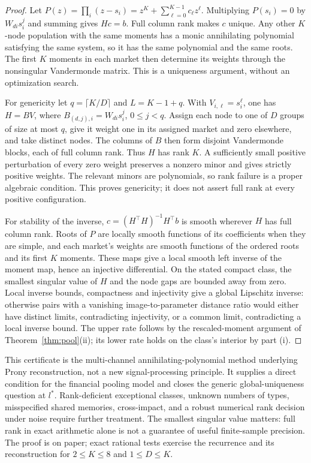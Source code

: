 \begin{proof}
Let $P(z)=\prod_i(z-s_i)=z^K+\sum_{\ell=0}^{K-1}c_\ell z^\ell$. Multiplying $P(s_i)=0$ by $W_{di}s_i^j$ and summing gives $Hc=b$. Full column rank makes $c$ unique. Any other $K$-node population with the same moments has a monic annihilating polynomial satisfying the same system, so it has the same polynomial and the same roots. The first $K$ moments in each market then determine its weights through the nonsingular Vandermonde matrix. This is a uniqueness argument, without an optimization search.

For genericity let $q=\lceil K/D\rceil$ and $L=K-1+q$. With $V_{i,\ell}=s_i^\ell$, one has $H=BV$, where $B_{(d,j),i}=W_{di}s_i^j$, $0\le j<q$. Assign each node to one of $D$ groups of size at most $q$, give it weight one in its assigned market and zero elsewhere, and take distinct nodes. The columns of $B$ then form disjoint Vandermonde blocks, each of full column rank. Thus $H$ has rank $K$. A sufficiently small positive perturbation of every zero weight preserves a nonzero minor and gives strictly positive weights. The relevant minors are polynomials, so rank failure is a proper algebraic condition. This proves genericity; it does not assert full rank at every positive configuration.

For stability of the inverse, $c=(H^\top H)^{-1}H^\top b$ is smooth wherever $H$ has full column rank. Roots of $P$ are locally smooth functions of its coefficients when they are simple, and each market's weights are smooth functions of the ordered roots and its first $K$ moments. These maps give a local smooth left inverse of the moment map, hence an injective differential. On the stated compact class, the smallest singular value of $H$ and the node gaps are bounded away from zero. Local inverse bounds, compactness and injectivity give a global Lipschitz inverse: otherwise pairs with a vanishing image-to-parameter distance ratio would either have distinct limits, contradicting injectivity, or a common limit, contradicting a local inverse bound. The upper rate follows by the rescaled-moment argument of Theorem~\ref{thm:pool}(ii); its lower rate holds on the class's interior by part (i).
\end{proof}

This certificate is the multi-channel annihilating-polynomial method underlying Prony reconstruction, not a new signal-processing principle. It supplies a direct condition for the financial pooling model and closes the generic global-uniqueness question at $l^*$. Rank-deficient exceptional classes, unknown numbers of types, misspecified shared memories, cross-impact, and a robust numerical rank decision under noise require further treatment. The smallest singular value matters: full rank in exact arithmetic alone is not a guarantee of useful finite-sample precision. The proof is on paper; exact rational tests exercise the recurrence and its reconstruction for $2\le K\le8$ and $1\le D\le K$.
